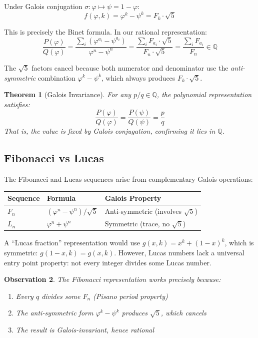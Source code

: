 \documentclass[11pt]{article}
\newtheorem{theorem}{Theorem}
\newtheorem{observation}[theorem]{Observation}
\begin{document}
Under Galois conjugation $\sigma: \varphi \mapsto \psi = 1-\varphi$:
\[
f(\varphi, k) = \varphi^k - \psi^k = F_k \cdot \sqrt{5}
\]

This is precisely the Binet formula. In our rational representation:
\[
\frac{P(\varphi)}{Q(\varphi)} = \frac{\sum_i (\varphi^{a_i} - \psi^{a_i})}{\varphi^n - \psi^n} = \frac{\sum_i F_{a_i} \cdot \sqrt{5}}{F_n \cdot \sqrt{5}} = \frac{\sum_i F_{a_i}}{F_n} \in \mathbb{Q}
\]

The $\sqrt{5}$ factors cancel because both numerator and denominator use the \emph{anti-symmetric} combination $\varphi^k - \psi^k$, which always produces $F_k \cdot \sqrt{5}$.

\begin{theorem}[Galois Invariance]
For any $p/q \in \mathbb{Q}$, the polynomial representation satisfies:
\[
\frac{P(\varphi)}{Q(\varphi)} = \frac{P(\psi)}{Q(\psi)} = \frac{p}{q}
\]
That is, the value is fixed by Galois conjugation, confirming it lies in $\mathbb{Q}$.
\end{theorem}

\subsection{Fibonacci vs Lucas}

The Fibonacci and Lucas sequences arise from complementary Galois operations:

\begin{center}
\begin{tabular}{@{}lll@{}}
\toprule
Sequence & Formula & Galois Property \\
\midrule
$F_n$ & $(\varphi^n - \psi^n)/\sqrt{5}$ & Anti-symmetric (involves $\sqrt{5}$) \\
$L_n$ & $\varphi^n + \psi^n$ & Symmetric (trace, no $\sqrt{5}$) \\
\bottomrule
\end{tabular}
\end{center}

A ``Lucas fraction'' representation would use $g(x,k) = x^k + (1-x)^k$, which is symmetric: $g(1-x,k) = g(x,k)$. However, Lucas numbers lack a universal entry point property: not every integer divides some Lucas number.

\begin{observation}
The Fibonacci representation works precisely because:
\begin{enumerate}
    \item Every $q$ divides some $F_n$ (Pisano period property)
    \item The anti-symmetric form $\varphi^k - \psi^k$ produces $\sqrt{5}$, which cancels
    \item The result is Galois-invariant, hence rational
\end{enumerate}
\end{observation}
\end{document}
